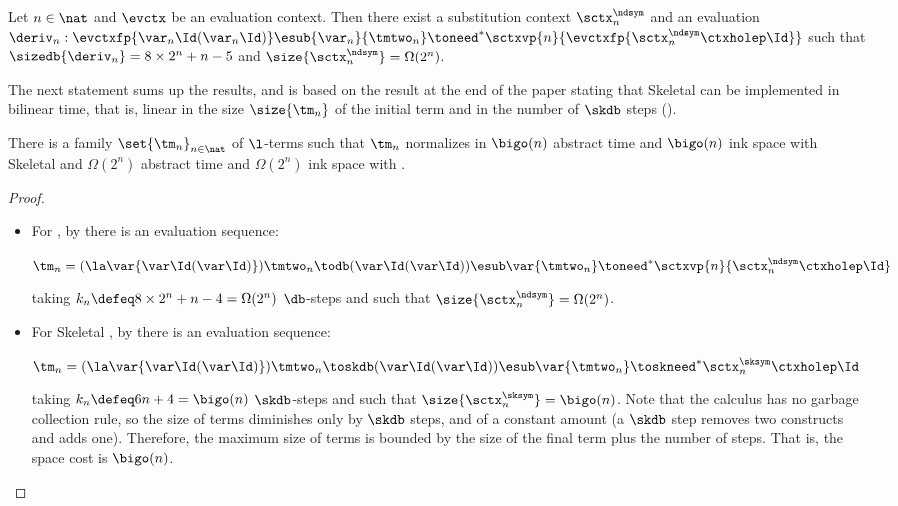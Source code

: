 \begin{toappendix}
\begin{lemma}
\label{l:need-family-aux2}
    Let $n \in \nat$ and $\evctx$ be an evaluation context.
  Then there exist a substitution context $\sctx^{\ndsym}_n$ and an evaluation
  $\deriv_n: \evctxfp{\var_n\Id(\var_n\Id)}\esub{\var_n}{\tmtwo_n}
  \toneed^* \sctxvp{n}{\evctxfp{\sctx^{\ndsym}_n\ctxholep\Id}}$ such that
  $\sizedb{\deriv_n} = 8 \times 2^n + n - 5$  and $\size{\sctx^{\ndsym}_n} = \Omega(2^n)$.
\end{lemma}
\end{toappendix}

The next statement sums up the results, and is based on the result at the end of the paper stating  that Skeletal \cbneed can be implemented in bilinear time, that is, linear in the size $\size{\tm_n}$ of the initial term and in the number of $\skdb$ steps ().

\begin{theorem}
\label{thm:family-speed-up}
There is a family $\set{\tm_n}_{n\in\nat}$ of $\l$-terms such that $\tm_n$ normalizes in $\bigo(n)$ abstract time and $\bigo(n)$ ink space with Skeletal \cbneed and $\Omega(2^n)$ abstract time and $\Omega(2^n)$ ink space with \cbneed.
\end{theorem}

\begin{proof}
\hfill
\begin{itemize}
\item For \cbneed, by  there is an evaluation sequence:
\begin{center}
 $\tm_n =(\la\var{\var \Id (\var \Id)}) \tmtwo_n \todb 
 (\var\Id (\var\Id)) \esub\var{\tmtwo_n} \toneed^*   \sctxvp{n}{\sctx^{\ndsym}_n\ctxholep\Id}
 $
 \end{center}
taking $k_n \defeq 8 \times 2^n + n - 4 = \Omega(2^n)$ $\db$-steps and such that $\size{\sctx^{\ndsym}_n} = \Omega(2^n)$.

\item For Skeletal \cbneed, by  there is an evaluation sequence:
\begin{center}
 $\tm_n =(\la\var{\var \Id (\var \Id)}) \tmtwo_n \toskdb 
 (\var\Id (\var\Id)) \esub\var{\tmtwo_n} \toskneed^*   \sctx_n^{\sksym}\ctxholep\Id
 $
 \end{center}
taking $k_n \defeq 6n+4 = \bigo(n)$ $\skdb$-steps and such that $\size{\sctx_n^{\sksym}} = \bigo(n)$. Note that the calculus has no garbage collection rule, so the size of terms diminishes only by $\skdb$ steps, and of a constant amount (a $\skdb$ step removes two constructs and adds one). Therefore, the maximum size of terms is bounded by the size of the final term plus the number of steps. That is, the space cost is $\bigo(n)$.
\qedhere
\end{itemize}
\end{proof}



